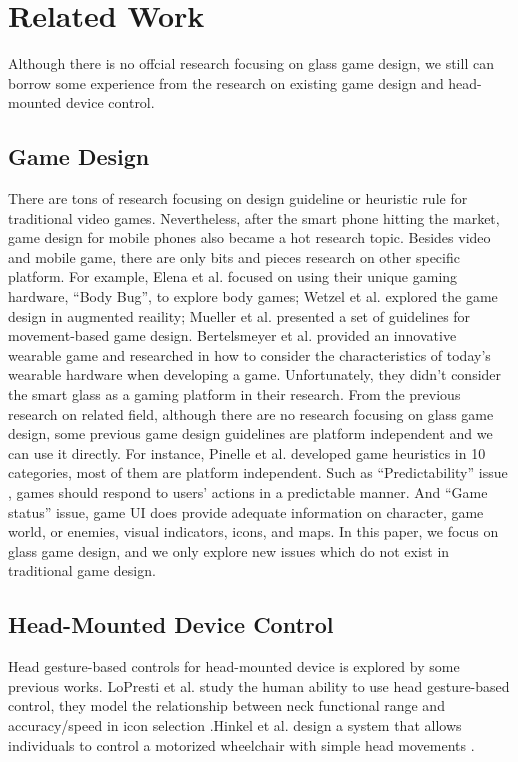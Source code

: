 \section{Related Work}

Although there is no offcial research focusing on glass game design, we still can borrow some experience from the research on existing game design and head-mounted device control.

\subsection{Game Design}

There are tons of research focusing on design guideline or heuristic rule for traditional video games\cite{gameflow,criticalreview,chi04game,09game,02game,08game,07game}. Nevertheless, after the smart phone hitting the market, game design for mobile phones also became a hot research topic\cite{mobilegame,mobile06,mobile08,icec06}. Besides video and mobile game, there are only bits and pieces research on other specific platform. For example, Elena et al. focused on using their unique gaming hardware, ``Body Bug'', to explore body games\cite{bodygame}; Wetzel et al. explored the game design in augmented reaility\cite{argame}; Mueller et al. presented a set of guidelines for movement-based game design\cite{movegame}. Bertelsmeyer et al. provided an innovative wearable game and researched in how to consider the characteristics of today's wearable hardware when developing a game\cite{wearable}. Unfortunately, they didn't consider the smart glass as a gaming platform in their research. 
From the previous research on related field, although there are no research focusing on glass game design, some previous game design guidelines are platform independent and we can use it directly. For instance, Pinelle et al.\cite{videogame} developed game heuristics in 10 categories, most of them are platform independent. 
Such as ``Predictability'' issue , games should respond to users' actions in a predictable manner. And ``Game status'' issue, game UI does provide adequate information on character, game world, or enemies, visual indicators, icons, and maps. 
In this paper, we focus on glass game design, and we only explore new issues which do not exist in traditional game design.


\subsection{Head-Mounted Device Control}
Head gesture-based controls for head-mounted device is explored by some previous works. LoPresti et al. study the human ability to use head gesture-based control, they model the relationship between neck functional range and accuracy/speed in icon selection \cite{neck}.Hinkel et al. design a system that allows individuals to control a motorized wheelchair with simple head movements \cite{wheel}.
